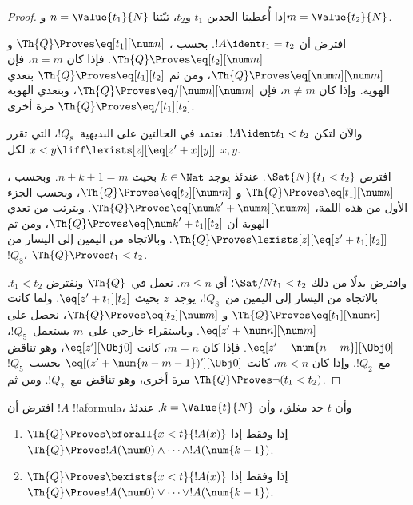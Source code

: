 \documentclass[../../../include/open-logic-section]{subfiles}
\begin{document}
\begin{proof}
إذا أُعطينا الحدين $t_1$ و$t_2$، ثبّتنا
$n=\Value{t_1}{N}$ و$m=\Value{t_2}{N}$.

افترض أن $!A\ident t_1=t_2$. بحسب
،
$\Th{Q}\Proves\eq[t_1][\num n]$ و
$\Th{Q}\Proves\eq[t_2][\num m]$. فإذا كان $n=m$، فإن
$\Th{Q}\Proves\eq[\num n][\num m]$، ومن ثم
$\Th{Q}\Proves\eq[t_1][t_2]$ بتعدي الهوية. وإذا كان $n\neq m$،
فإن $\Th{Q}\Proves\eq/[\num n][\num m]$، وبتعدي الهوية مرة أخرى
$\Th{Q}\Proves\eq/[t_1][t_2]$.

والآن لتكن $!A\ident t_1<t_2$. نعتمد في الحالتين على
البديهية~$!Q_8$، التي تقرر
$x<y\liff\lexists[z][\eq[z'+x][y]]$ لكل $x,y$.

افترض $\Sat{N}{t_1<t_2}$. عندئذ يوجد $k\in\Nat$ بحيث
$n+k+1=m$. وبحسب ،
$\Th{Q}\Proves\eq[t_1][\num n]$ و
$\Th{Q}\Proves\eq[t_2][\num m]$، وبحسب الجزء الأول من هذه اللمة،
$\Th{Q}\Proves\eq[{\num k}'+\num n][\num m]$. ويترتب من تعدي
الهوية أن
$\Th{Q}\Proves\eq[{\num k}'+t_1][t_2]$، ومن ثم
$\Th{Q}\Proves\lexists[z][\eq[z'+t_1][t_2]]$. وبالاتجاه من اليمين
إلى اليسار من~$!Q_8$، $\Th{Q}\Proves t_1<t_2$.

وافترض بدلًا من ذلك $\Sat/{N}{t_1<t_2}$؛ أي $m\leq n$.
%
نعمل في~$\Th{Q}$ ونفترض $t_1<t_2$. بالاتجاه من اليسار إلى اليمين
من~$!Q_8$، يوجد~$z$ بحيث $\eq[z'+t_1][t_2]$. ولما كانت
$\Th{Q}\Proves\eq[t_1][\num n]$ و
$\Th{Q}\Proves\eq[t_2][\num m]$، نحصل على
$\eq[z'+\num n][\num m]$.
%
وباستقراء خارجي على~$m$ يستعمل~$!Q_5$،
$\eq[z'+\num{n-m}][\Obj 0]$. فإذا كان $m=n$، كانت
$\eq[z'][\Obj 0]$، وهو تناقض مع~$!Q_2$. وإذا كان $m<n$، كانت
$\eq[(z'+\num{n-m-1})'][\Obj 0]$ بحسب~$!Q_5$ مرة أخرى، وهو تناقض
مع~$!Q_2$. ومن ثم $\Th{Q}\Proves\lnot(t_1<t_2)$.
\end{proof}

\begin{lem}
افترض أن $!A$ !!a{formula}، وأن $t$ حد مغلق، وأن
$k=\Value{t}{N}$. عندئذ
\begin{enumerate}
\item $\Th{Q}\Proves\bforall{x<t}{!A(x)}$ إذا وفقط إذا
    $\Th{Q}\Proves !A(\num 0)\land\dots\land !A(\num{k-1})$.
\item $\Th{Q}\Proves\bexists{x<t}{!A(x)}$ إذا وفقط إذا
    $\Th{Q}\Proves !A(\num 0)\lor\dots\lor !A(\num{k-1})$.
\end{enumerate}
\end{lem}
\end{document}
